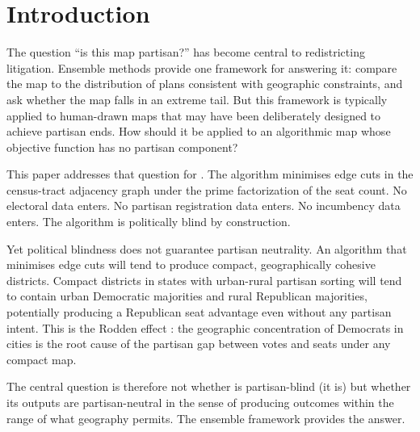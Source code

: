 \section{Introduction}
\label{sec:intro}

The question ``is this map partisan?'' has become central to redistricting
litigation.  Ensemble methods provide one framework for answering it: compare
the map to the distribution of plans consistent with geographic constraints,
and ask whether the map falls in an extreme tail.  But this framework is
typically applied to human-drawn maps that may have been deliberately designed
to achieve partisan ends.  How should it be applied to an algorithmic map
whose objective function has no partisan component?

This paper addresses that question for \ar{} \citep{dellaLibera2026b11}.
The \ar{} algorithm minimises edge cuts in the census-tract adjacency graph
under the prime factorization of the seat count.  No electoral data enters.
No partisan registration data enters.  No incumbency data enters.  The
algorithm is politically blind by construction.

Yet political blindness does not guarantee partisan neutrality.  An algorithm
that minimises edge cuts will tend to produce compact, geographically cohesive
districts.  Compact districts in states with urban-rural partisan sorting will
tend to contain urban Democratic majorities and rural Republican majorities,
potentially producing a Republican seat advantage even without any partisan
intent.  This is the Rodden effect \citep{rodden2019why}: the geographic
concentration of Democrats in cities is the root cause of the partisan gap
between votes and seats under any compact map.

The central question is therefore not whether \ar{} is partisan-blind
(it is) but whether its outputs are partisan-neutral in the sense of
producing outcomes within the range of what geography permits.  The ensemble
framework provides the answer.

